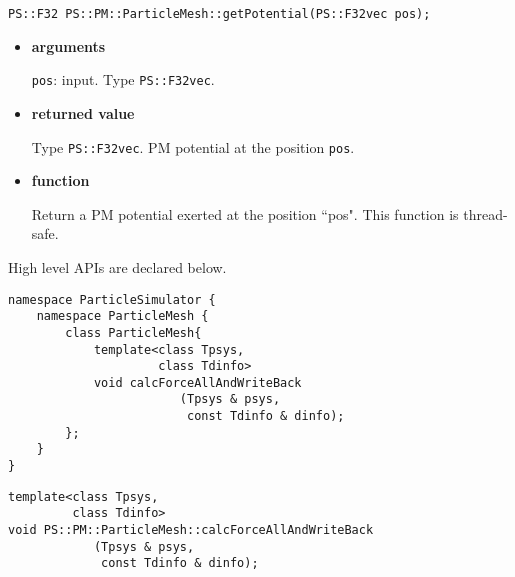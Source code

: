 \begin{screen}
\begin{verbatim}
PS::F32 PS::PM::ParticleMesh::getPotential(PS::F32vec pos);
\end{verbatim}
\end{screen}

\begin{itemize}

\item {\bf arguments}

{\tt pos}: input. Type {\tt PS::F32vec}. %


\item {\bf returned value}

Type {\tt PS::F32vec}. PM potential at the position {\tt pos}.

\item {\bf function}

Return a PM potential exerted at the position ``pos".
This function is thread-safe.

\end{itemize}




High level APIs are declared below.

\begin{lstlisting}[caption=ParticleMesh1]
namespace ParticleSimulator {
    namespace ParticleMesh {
        class ParticleMesh{
            template<class Tpsys,
                     class Tdinfo>
            void calcForceAllAndWriteBack
                        (Tpsys & psys,
                         const Tdinfo & dinfo);
        };
    }
}
\end{lstlisting}


\begin{screen}
\begin{verbatim}
template<class Tpsys,
         class Tdinfo>
void PS::PM::ParticleMesh::calcForceAllAndWriteBack
            (Tpsys & psys,
             const Tdinfo & dinfo);
\end{verbatim}
\end{screen}

